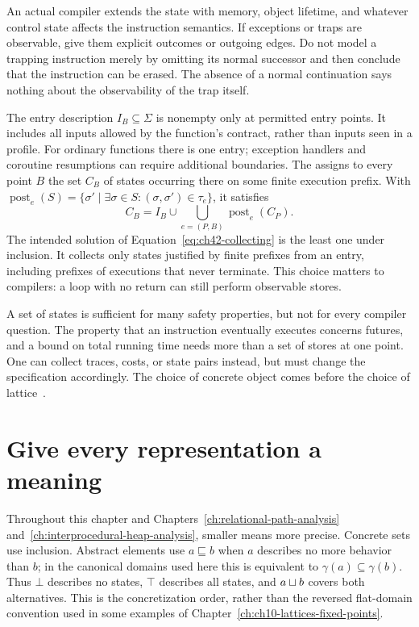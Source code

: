 An actual compiler extends the state with memory, object lifetime, and whatever control state affects the instruction semantics.
If exceptions or traps are observable, give them explicit outcomes or outgoing edges.
Do not model a trapping instruction merely by omitting its normal successor and then conclude that the instruction can be erased.
The absence of a normal continuation says nothing about the observability of the trap itself.

The entry description $I_B\subseteq\Sigma$ is nonempty only at permitted entry points.
It includes all inputs allowed by the function's contract, rather than inputs seen in a profile.
For ordinary functions there is one entry; exception handlers and coroutine resumptions can require additional boundaries.
The  assigns to every point $B$ the set $C_B$ of states occurring there on some finite execution prefix.
With $\operatorname{post}_e(S)=\{\sigma'\mid \exists\sigma\in S:(\sigma,\sigma')\in\tau_e\}$, it satisfies
\begin{equation}
 C_B=I_B\cup\bigcup_{e=(P,B)}\operatorname{post}_e(C_P).
 \label{eq:ch42-collecting}
\end{equation}
The intended solution of Equation~\ref{eq:ch42-collecting} is the least one under inclusion.
It collects only states justified by finite prefixes from an entry, including prefixes of executions that never terminate.
This choice matters to compilers: a loop with no return can still perform observable stores.

A set of states is sufficient for many safety properties, but not for every compiler question.
The property that an instruction eventually executes concerns futures, and a bound on total running time needs more than a set of stores at one point.
One can collect traces, costs, or state pairs instead, but must change the specification accordingly.
The choice of concrete object comes before the choice of lattice~\cite{nielson-1999-principles}.

\section{Give every representation a meaning}
\label{sec:ch42-representation}

Throughout this chapter and Chapters~\ref{ch:relational-path-analysis} and~\ref{ch:interprocedural-heap-analysis}, smaller means more precise.
Concrete sets use inclusion.
Abstract elements use $a\sqsubseteq b$ when $a$ describes no more behavior than $b$; in the canonical domains used here this is equivalent to $\gamma(a)\subseteq\gamma(b)$.
Thus $\bot$ describes no states, $\top$ describes all states, and $a\sqcup b$ covers both alternatives.
This is the concretization order, rather than the reversed flat-domain convention used in some examples of Chapter~\ref{ch:ch10-lattices-fixed-points}.

